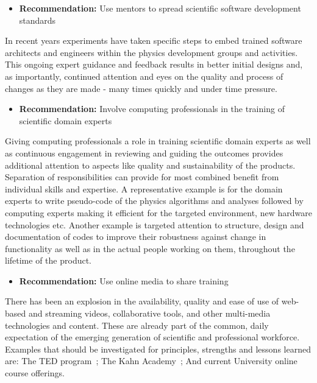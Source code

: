 \begin{itemize}
\item[] {\bf Recommendation:} Use mentors to spread scientific software development standards
\end{itemize}

In recent years experiments have taken specific steps to embed
trained software architects and engineers within the physics
development groups and activities. This ongoing expert guidance and
feedback results in better initial designs and, as importantly,
continued attention and eyes on the quality and process of changes
as they are made - many times quickly and under time pressure.

\begin{itemize}
\item[] {\bf Recommendation:} Involve computing professionals in the training of scientific domain experts
\end{itemize}

Giving computing professionals a role in training scientific domain
experts as well as continuous engagement in reviewing and guiding
the outcomes provides additional  attention to aspects like quality
and sustainability of the  products.  Separation of responsibilities
can provide for most combined benefit from individual skills and
expertise.  A representative example is for the domain experts to
write pseudo-code of the physics algorithms and analyses followed
by computing experts making it efficient for the targeted environment,
new hardware technologies etc.  Another example is targeted attention
to structure,  design and documentation of codes to improve their
robustness against change in functionality  as well as in the actual
people  working on them, throughout the lifetime of the product.

\begin{itemize}
\item[] {\bf Recommendation:} Use online media to share training
\end{itemize}

There has been an explosion in the availability, quality and ease
of use of web-based and streaming videos, collaborative tools, and
other multi-media technologies and content. These are already part
of the common, daily expectation of the emerging generation of
scientific and professional workforce. Examples that should be
investigated for principles, strengths and lessons learned are: The
TED program~\cite{TED}; The Kahn Academy~\cite{KHANACAD}; And current
University  online course offerings.


